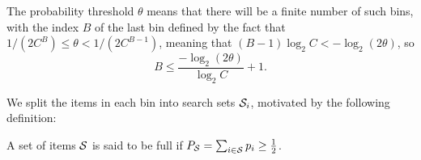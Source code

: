 The probability threshold $\theta$ means that
there will be a finite number of such bins, with the index $B$ of the last bin defined by the fact that $1/(2C^B) \leq
\theta < 1/(2C^{B-1})$, meaning that $(B -1) \log_2 C < - \log_2 (2 \theta)$, so
\begin{equation} \label{eq:bincount} B \leq  \frac{ - \log_2 (2 \theta)}{\log_2 C} + 1. \end{equation}

We split the items in each bin into search sets ${\mathcal{S}}_i$, motivated by the following definition:

\begin{definition} \label{def:full}
A set of items \( {\mathcal{S}} \) is said to be full if $P_{{\mathcal{S}}} = \sum_{i \in {\mathcal{S}}} p_i \geq \frac{1}{2}$.
\end{definition}


